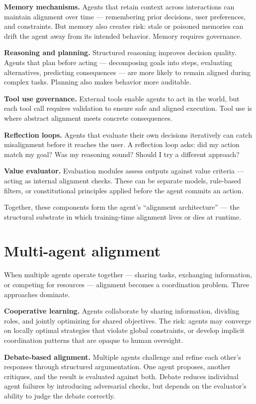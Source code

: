 \textbf{Memory mechanisms.} Agents that retain context across interactions can maintain alignment over time --- remembering prior decisions, user preferences, and constraints. But memory also creates risk: stale or poisoned memories can drift the agent away from its intended behavior. Memory requires governance.

\textbf{Reasoning and planning.} Structured reasoning improves decision quality. Agents that plan before acting --- decomposing goals into steps, evaluating alternatives, predicting consequences --- are more likely to remain aligned during complex tasks. Planning also makes behavior more auditable.

\textbf{Tool use governance.} External tools enable agents to act in the world, but each tool call requires validation to ensure safe and aligned execution. Tool use is where abstract alignment meets concrete consequences.

\textbf{Reflection loops.} Agents that evaluate their own decisions iteratively can catch misalignment before it reaches the user. A reflection loop asks: did my action match my goal? Was my reasoning sound? Should I try a different approach?

\textbf{Value evaluator.} Evaluation modules assess outputs against value criteria --- acting as internal alignment checks. These can be separate models, rule-based filters, or constitutional principles applied before the agent commits an action.

Together, these components form the agent's ``alignment architecture'' --- the structural substrate in which training-time alignment lives or dies at runtime.

\section{Multi-agent alignment}

When multiple agents operate together --- sharing tasks, exchanging information, or competing for resources --- alignment becomes a coordination problem. Three approaches dominate.

\textbf{Cooperative learning.} Agents collaborate by sharing information, dividing roles, and jointly optimizing for shared objectives. The risk: agents may converge on locally optimal strategies that violate global constraints, or develop implicit coordination patterns that are opaque to human oversight.

\textbf{Debate-based alignment.} Multiple agents challenge and refine each other's responses through structured argumentation. One agent proposes, another critiques, and the result is evaluated against both. Debate reduces individual agent failures by introducing adversarial checks, but depends on the evaluator's ability to judge the debate correctly.

